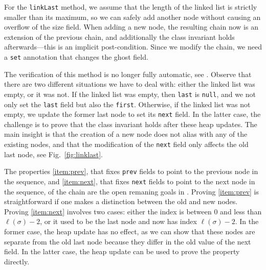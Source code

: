 \documentclass[runningheads]{llncs}
\begin{document}


For the \texttt{linkLast} method, we assume that the length of the linked list is strictly smaller than its maximum, so we can safely add another node without causing an overflow of the size field. When adding a new node, the resulting chain now is an extension of the previous chain, and additionally the class invariant holds afterwards---this is an implicit post-condition. Since we modify the chain, we need a \texttt{set} annotation that changes the ghost field.



The verification of this method is no longer fully automatic, see \cite[1:25--6:52]{Bian2019addbranch}. Observe that there are two different situations we have to deal with: either the linked list was empty, or it was not. If the linked list was empty, then \texttt{last} is \texttt{null}, and we not only set the \texttt{last} field but also the \texttt{first}. Otherwise, if the linked list was not empty, we update the former last node to set its \texttt{next} field. In the latter case, the challenge is to prove that the class invariant holds after these heap updates. The main insight is that the creation of a new node does not alias with any of the existing nodes, and that the modification of the \texttt{next} field only affects the old last node, see Fig.~\ref{fig:linklast}.

The properties \ref{item:prev}, that fixes \texttt{prev} fields to point to the previous node in the sequence, and \ref{item:next}, that fixes \texttt{next} fields to point to the next node in the sequence, of the chain are the open remaning goals in \cite[3:58]{Bian2019addbranch}. Proving \ref{item:prev} is straightforward if one makes a distinction between the old and new nodes. Proving \ref{item:next} involves two cases: either the index is between $0$ and less than $\ell(\sigma)-2$, or it used to be the last node and now has index $\ell(\sigma)-2$. In the former case, the heap update has no effect, as we can show that these nodes are separate from the old last node because they differ in the old value of the next field. In the latter case, the heap update can be used to prove the property directly.
\end{document}
